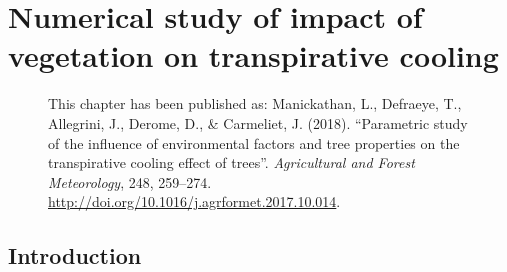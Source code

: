 \chapter{Numerical study of impact of vegetation on transpirative cooling}
\label{ch:parametricstudy}
\def\figdir{chapters/ch06_numericalmodelsimple/figures}

\begin{figure}[h]
	\centering
	\begin{minipage}{0.9\textwidth}
		\textsf{ \footnotesize This chapter has been published as: Manickathan, L., Defraeye, T., Allegrini, J., Derome, D., \& Carmeliet, J. (2018). ``Parametric study of the influence of environmental factors and tree properties on the transpirative cooling effect of trees''. \textit{Agricultural and Forest Meteorology}, 248, 259–274. \url{http://doi.org/10.1016/j.agrformet.2017.10.014}.}
	\end{minipage}
\end{figure}
\vspace{2em}

	

\section{Introduction}


